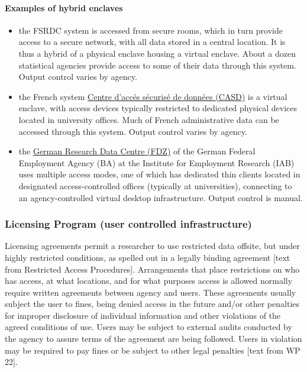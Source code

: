 \paragraph{Examples of hybrid enclaves}
\begin{itemize}
    \item the FSRDC system is accessed from secure rooms, which in turn provide access to a secure network, with all data stored in a central location. It is thus a hybrid of a physical enclave housing a virtual enclave. About a dozen statistical agencies provide access to some of their data through this system. Output control varies by agency.
    \item the French system \href{https://casd.eu}{Centre d'acc\'es s\'ecuris\'e de donn\'ees (CASD)} is a virtual enclave, with access devices typically restricted to dedicated physical devices located in university offices. Much of French administrative data can be accessed through this system. Output control varies by agency.
    \item the \href{https://fdz.iab.de/}{German Research Data Centre (FDZ)} of the German Federal Employment Agency (BA) at the Institute for Employment Research (IAB) uses multiple access modes, one of which has dedicated thin clients located in designated access-controlled offices (typically at universities), connecting to an agency-controlled virtual desktop infrastructure. Output control is manual.
\end{itemize}

\subsubsection{Licensing Program (user controlled infrastructure)}

Licensing agreements permit a researcher to use restricted data offsite, but under highly restricted
conditions, as spelled out in a legally binding agreement [text from Restricted Access Procedures]. Arrangements that place restrictions on who has access, at what locations, and for what purposes access is allowed normally require written agreements between agency and users. These agreements usually subject the user to fines, being denied access in the future and/or other penalties for improper disclosure of individual information and other violations of the agreed conditions of use. Users may be subject to external audits conducted by the agency to assure terms of the agreement are being followed. Users in violation may be required to pay fines or be subject to other legal penalties [text from WP 22].

